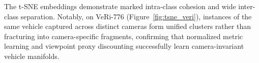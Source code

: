 The t-SNE embeddings demonstrate marked intra-class cohesion and wide inter-class separation. Notably, on VeRi-776 (Figure~\ref{fig:tsne_veri}), instances of the same vehicle captured across distinct cameras form unified clusters rather than fracturing into camera-specific fragments, confirming that normalized metric learning and viewpoint proxy discounting successfully learn camera-invariant vehicle manifolds.
